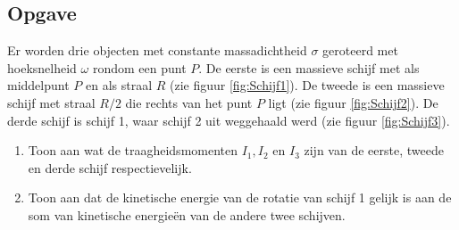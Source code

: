 \documentclass[a4paper,11pt]{article}
\begin{document}
\subsection*{Opgave}
Er worden drie objecten met constante massadichtheid $\sigma$ geroteerd met hoeksnelheid $\omega$ rondom een punt $P$. De eerste is een massieve schijf met als middelpunt $P$ en als straal $R$ (zie figuur \ref{fig:Schijf1}). De tweede is een massieve schijf met straal $R/2$ die rechts van het punt $P$ ligt (zie figuur \ref{fig:Schijf2}). De derde schijf is schijf 1, waar schijf 2 uit weggehaald werd (zie figuur \ref{fig:Schijf3}).
\begin{enumerate}[label=(\alph*)]
	\item Toon aan wat de traagheidsmomenten $I_1,I_2$ en $I_3$ zijn van de eerste, tweede en derde schijf respectievelijk.
	\item Toon aan dat de kinetische energie van de rotatie van schijf 1 gelijk is aan de som van kinetische energie\"en van de andere twee schijven.
\end{enumerate}
\end{document}
